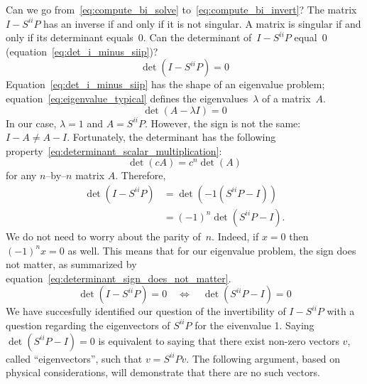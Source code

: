 Can we go from~\eqref{eq:compute_bi_solve} to~\eqref{eq:compute_bi_invert}?
The matrix~$I - S^{ii}P$ has an inverse if and only if it is not singular.
A matrix is singular if and only if its determinant equals~0.
Can the determinant of~$I - S^{ii}P$ equal~0 (equation~\eqref{eq:det_i_minus_siip})?
\begin{equation}
    \det(I - S^{ii}P) = 0 \label{eq:det_i_minus_siip}
\end{equation}
Equation~\eqref{eq:det_i_minus_siip} has the shape of an eigenvalue problem;
equation~\eqref{eq:eigenvalue_typical} defines the eigenvalues~$\lambda$ of a matrix~$A$.
\begin{equation}
    \det(A - \lambda I) = 0 \label{eq:eigenvalue_typical}
\end{equation}
In our case, $\lambda=1$ and $A=S^{ii}P$.
However, the sign is not the same: $I-A \neq A-I$.
Fortunately, the determinant has the following property~\eqref{eq:determinant_scalar_multiplication}:
\begin{equation}
    \det(c A) = c^n \det(A) \label{eq:determinant_scalar_multiplication}
\end{equation}
for any $n$--by--$n$ matrix $A$.
Therefore,
\begin{subequations}
    \begin{align}
        \det(I - S^{ii}P)
        &= \det(-1(S^{ii}P - I)) \\
        &= (-1)^n \det(S^{ii}P - I) \text{.}
    \end{align}
\end{subequations}
We do not need to worry about the parity of~$n$.
Indeed, if $x=0$ then $(-1)^n x = 0$ as well.
This means that for our eigenvalue problem, the sign does not matter, as summarized by equation~\eqref{eq:determinant_sign_does_not_matter}.
\begin{equation}
    \det(I - S^{ii}P) = 0
    \quad
    \Longleftrightarrow
    \quad
    \det(S^{ii}P - I) = 0
    \label{eq:determinant_sign_does_not_matter}
\end{equation}
We have succesfully identified our question of the invertibility of $I - S^{ii}P$ with a question regarding the eigenvectors of $S^{ii}P$ for the eivenvalue 1.
Saying $\det(S^{ii}P - I) = 0$ is equivalent to saying that there exist non-zero vectors $v$, called ``eigenvectors'', such that $v = S^{ii}Pv$.
The following argument, based on physical considerations, will demonstrate that there are no such vectors.

